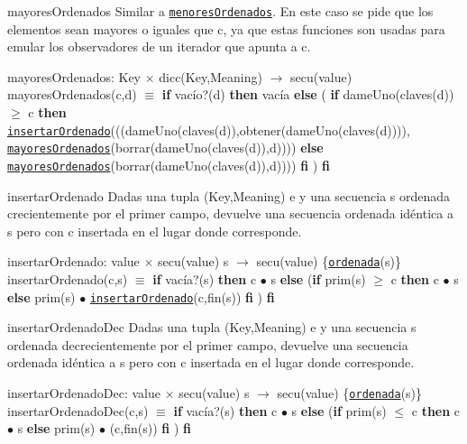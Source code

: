 \begin{DoxyParagraph}{mayores\+Ordenados}
Similar a \href{axiomas.html#menoresOrdenados}{\tt menores\+Ordenados}. En este caso se pide que los elementos sean mayores o iguales que c, ya que estas funciones son usadas para emular los observadores de un iterador que apunta a c.

mayores\+Ordenados\+: Key $\times$ dicc(\+Key,\+Meaning) $\to$ secu(value) ~\newline
 mayores\+Ordenados(c,d) $\equiv$ {\bfseries if} vacío?(d) {\bfseries then} vacía {\bfseries else} ( {\bfseries if} dame\+Uno(claves(d)) $\geq$ c {\bfseries then} \href{axiomas.html#insertarOrdenado}{\tt insertar\+Ordenado}(((dame\+Uno(claves(d)),obtener(dame\+Uno(claves(d)))), \href{axiomas.html#mayoresOrdenados}{\tt mayores\+Ordenados}(borrar(dame\+Uno(claves(d)),d)))) {\bfseries else} \href{axiomas.html#mayoresOrdenados}{\tt mayores\+Ordenados}(borrar(dame\+Uno(claves(d)),d)))) {\bfseries fi} ) {\bfseries fi} 


\end{DoxyParagraph}
\begin{DoxyParagraph}{insertar\+Ordenado}
Dadas una tupla (Key,Meaning) e y una secuencia s ordenada crecientemente por el primer campo, devuelve una secuencia ordenada idéntica a s pero con c insertada en el lugar donde corresponde.

insertar\+Ordenado\+: value $\times$ secu(value) s $\to$ secu(value) \{\href{axiomas.html#ordenada}{\tt ordenada}(s)\} ~\newline
 insertar\+Ordenado(c,s) $\equiv$ {\bfseries if} vacía?(s) {\bfseries then} c $\bullet$ s {\bfseries else} ({\bfseries if} prim(s) $\geq$ c {\bfseries then} c $\bullet$ s {\bfseries else} prim(s) $\bullet$ \href{axiomas.html#insertarOrdenado}{\tt insertar\+Ordenado}(c,fin(s)) {\bfseries fi} ) {\bfseries fi} 


\end{DoxyParagraph}
\begin{DoxyParagraph}{insertar\+Ordenado\+Dec}
Dadas una tupla (Key,Meaning) e y una secuencia s ordenada decrecientemente por el primer campo, devuelve una secuencia ordenada idéntica a s pero con c insertada en el lugar donde corresponde.

insertar\+Ordenado\+Dec\+: value $\times$ secu(value) s $\to$ secu(value) \{\href{axiomas.html#ordenada}{\tt ordenada}(s)\} ~\newline
 insertar\+Ordenado\+Dec(c,s) $\equiv$ {\bfseries if} vacía?(s) {\bfseries then} c $\bullet$ s {\bfseries else} ({\bfseries if} prim(s) $\leq$ c {\bfseries then} c $\bullet$ s {\bfseries else} prim(s) $\bullet$ (c,fin(s)) {\bfseries fi} ) {\bfseries fi} 


\end{DoxyParagraph}
